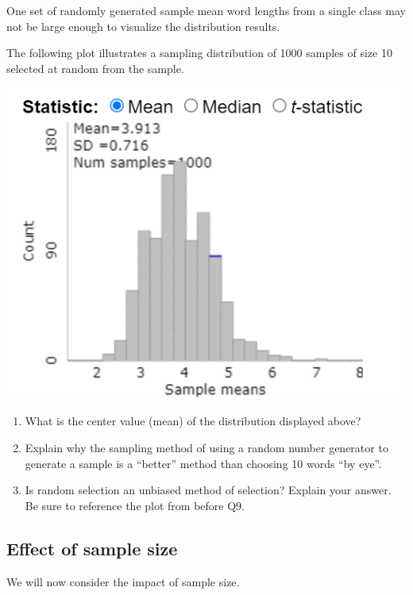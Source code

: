 \documentclass[
]{report}
\begin{document}
One set of randomly generated sample mean word lengths from a single class may not be large enough to visualize the distribution results.

\newpage

The following plot illustrates a sampling distribution of 1000 samples of size 10 selected at random from the sample.

\begin{center}\includegraphics[width=0.75\linewidth]{images/bencenti_sampling10} \end{center}

\begin{enumerate}
\def\labelenumi{\arabic{enumi}.}
\setcounter{enumi}{8}
\item
  What is the center value (mean) of the distribution displayed above?
  \vspace{0.3in}
\item
  Explain why the sampling method of using a random number generator to generate a sample is a ``better'' method than choosing 10 words ``by eye''.
  \vspace{0.8in}
\item
  Is random selection an unbiased method of selection? Explain your answer. Be sure to reference the plot from before Q9.
  \vspace{0.5in}
\end{enumerate}

\newpage

\subsection*{Effect of sample size}\label{effect-of-sample-size}

We will now consider the impact of sample size.
\end{document}
